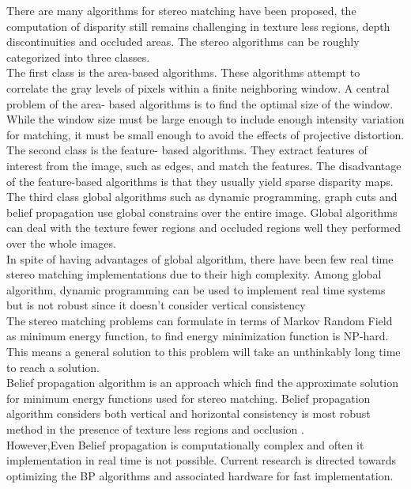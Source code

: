 There are many algorithms for stereo matching have been proposed, the computation of disparity still remains challenging in texture less regions, depth discontinuities and occluded areas. The stereo algorithms can be roughly categorized into three classes.\\
The first class is the area-based algorithms. These algorithms attempt to correlate the gray levels of pixels within a finite neighboring window. A central problem of the area- based algorithms is to find the optimal size of the window. While the window size must be large enough to include enough intensity variation for matching, it must be small enough to avoid the effects of projective distortion.\\
The second class is the feature- based algorithms. They extract features of interest from the image, such as edges, and match the features. The disadvantage of the feature-based algorithms is that they usually yield sparse disparity maps.\\
The third class global algorithms such as dynamic programming, graph cuts and belief propagation use global constrains over the entire image. Global algorithms can deal with the texture fewer regions and occluded regions well they performed over the whole images.\\
In spite of having advantages of global algorithm, there have been few real time stereo matching implementations due to their high complexity. Among global algorithm, dynamic programming can be used to implement real time systems but is not robust since it doesn't consider vertical consistency\\
The stereo matching problems can formulate in terms of Markov Random Field as minimum energy function, to find energy minimization function is NP-hard. This means a general solution to this problem will take an unthinkably long time to reach a solution.\\
Belief propagation algorithm is an approach which find the approximate solution for minimum energy functions used for stereo matching.
Belief propagation algorithm considers both vertical and horizontal consistency is most robust method in the presence of texture less regions and occlusion .\\
However,Even  Belief propagation is computationally complex and often it implementation in real time is not possible.
Current research is directed towards optimizing the BP algorithms and associated hardware for fast implementation.





